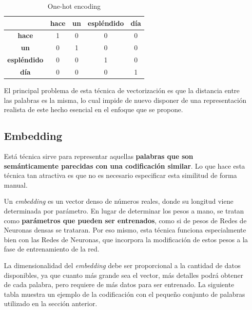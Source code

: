 \documentclass[12pt,a4paper, xcolor=table]{article}
\begin{document}
\newpage

  \begin{table}[!h]
        \centering
        \begin{tabular}{|c|c|c|c|c|}
        \hline
        \textbf{} &\textbf{hace} & \textbf{un} & \textbf{espléndido} & \textbf{día}  \\ \hline
        \textbf{hace}                     & 1 & 0 & 0 & 0\\ \hline
        \textbf{un}                       & 0 & 1 & 0 & 0\\ \hline
        \textbf{espléndido}               & 0 & 0 & 1 & 0\\ \hline
        \textbf{día}                      & 0 & 0 & 0 & 1\\ \hline
        \end{tabular}
        \caption{One-hot encoding}
            \label{fig:graf_exp1}
    \end{table}

\vspace{2mm}

El principal problema de esta técnica de vectorización es que la distancia entre las palabras es la misma, lo cual impide de nuevo disponer de una representación realista de este hecho esencial en el enfoque que se propone.

\subsection{Embedding}

Está técnica sirve para representar aquellas \textbf{palabras que son semánticamente parecidas con una codificación similar}. Lo que hace esta técnica tan atractiva es que no es necesario especificar esta similitud de forma manual.

\vspace{2mm}

Un \textit{embedding} es un vector denso de números reales, donde su longitud viene determinada por parámetro. En lugar de determinar los pesos a mano, se tratan como \textbf{parámetros que pueden ser entrenados}, como si de pesos de Redes de Neuronas densas se trataran. Por eso mismo, esta técnica funciona especialmente bien con las Redes de Neuronas, que incorpora la modificación de estos pesos a la fase de entrenamiento de la red.

\vspace{2mm}

La dimensionalidad del \textit{embedding} debe ser proporcional a la cantidad de datos disponibles, ya que cuanto más grande sea el vector, más detalles podrá obtener de cada palabra, pero requiere de más datos para ser entrenado. La siguiente tabla muestra un ejemplo de la codificación con el pequeño conjunto de palabras utilizado en la sección anterior.
\end{document}
